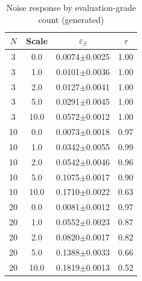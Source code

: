 \begin{table}[h]
\small
\centering
\caption{Noise response by evaluation-grade count (generated)}
\label{tab:noise_large}
\begin{tabular}{cccc}
\hline
$N$&Scale&$\varepsilon_\beta$&$\tau$\\
\hline
3&0.0&0.0074$\pm$0.0025&1.00\\
3&1.0&0.0101$\pm$0.0036&1.00\\
3&2.0&0.0127$\pm$0.0041&1.00\\
3&5.0&0.0291$\pm$0.0045&1.00\\
3&10.0&0.0572$\pm$0.0012&1.00\\
10&0.0&0.0073$\pm$0.0018&0.97\\
10&1.0&0.0342$\pm$0.0055&0.99\\
10&2.0&0.0542$\pm$0.0046&0.96\\
10&5.0&0.1075$\pm$0.0017&0.90\\
10&10.0&0.1710$\pm$0.0022&0.63\\
20&0.0&0.0081$\pm$0.0012&0.97\\
20&1.0&0.0552$\pm$0.0023&0.87\\
20&2.0&0.0820$\pm$0.0017&0.82\\
20&5.0&0.1388$\pm$0.0033&0.66\\
20&10.0&0.1819$\pm$0.0013&0.52\\
\hline
\end{tabular}
\end{table}
